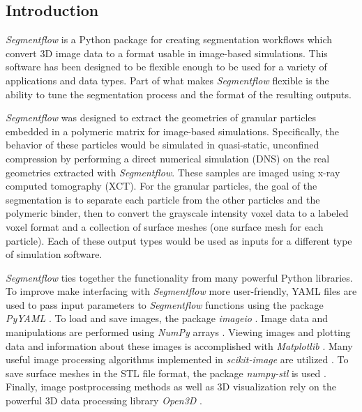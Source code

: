 \subsection{Introduction}
\textit{Segmentflow} is a Python package for creating segmentation
workflows which
convert 3D image data to a format usable in image-based simulations.
This software has been designed to be flexible enough
to be used for a variety of applications and data types. Part of what
makes \textit{Segmentflow} flexible is the ability to tune the segmentation
process and the format of the resulting outputs.

\textit{Segmentflow} was designed
to extract the geometries of granular particles embedded
in a polymeric matrix for image-based simulations.
Specifically, the behavior of these particles would be simulated in
quasi-static, unconfined compression by performing a
direct numerical simulation (DNS) on the real geometries
extracted with \textit{Segmentflow}.
These samples are imaged using x-ray computed tomography (XCT).
For the granular particles, the goal of the segmentation is to separate
each particle from the other particles and the polymeric binder,
then to convert the grayscale intensity voxel data to
a labeled voxel format and a collection of surface meshes
(one surface mesh for each particle).
Each of these output types would be
used as inputs for a different type of simulation software.

\textit{Segmentflow} ties together the functionality from many powerful
Python libraries. To improve make interfacing with \textit{Segmentflow}
more user-friendly, YAML files are used to pass input parameters to
\textit{Segmentflow} functions using the package \textit{PyYAML} \cite{pyyaml}.
To load and save images, the package \textit{imageio} \cite{imageio}.
Image data and manipulations are performed using \textit{NumPy} arrays
\cite{numpy}. Viewing images and plotting data and information about these
images is accomplished with \textit{Matplotlib} \cite{matplotlib}.
Many useful image processing algorithms implemented in
\textit{scikit-image} are utilized \cite{skimage}. To save surface meshes
in the STL file format, the package \textit{numpy-stl} is used \cite{numpystl}.
Finally, image postprocessing methods as well as 3D visualization rely on
the powerful 3D data processing library \textit{Open3D} \cite{Zhou2018}.

